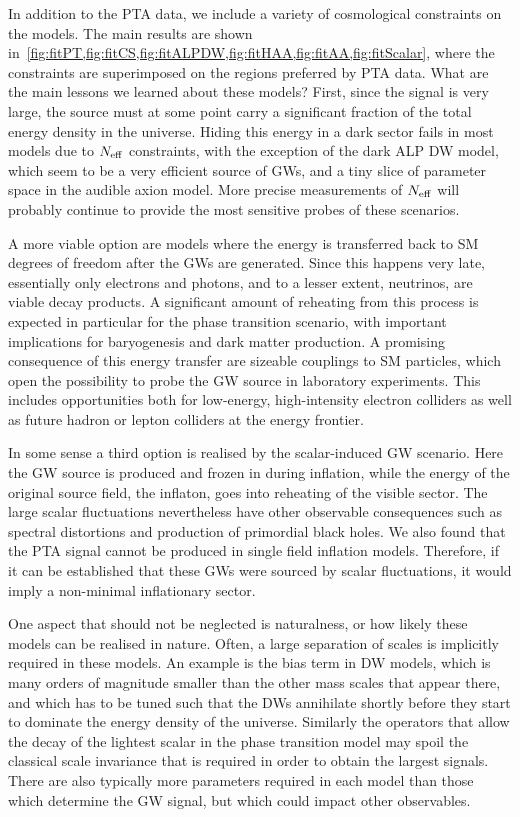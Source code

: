 \documentclass{article}
\begin{document}
In addition to the PTA data, we include a variety of cosmological constraints on the models. The main results are shown in~\cref{fig:fitPT,fig:fitCS,fig:fitALPDW,fig:fitHAA,fig:fitAA,fig:fitScalar}, where the constraints are superimposed on the regions preferred by PTA data. What are the main lessons we learned about these models? First, since the signal is very large, the source must at some point carry a significant fraction of the total energy density in the universe. Hiding this energy in a dark sector fails in most models due to $N_{\rm eff}$ constraints, with the exception of the dark ALP DW model, which seem to be a very efficient source of GWs, and a tiny slice of parameter space in the audible axion model. More precise measurements of $N_{\rm eff}$ will probably continue to provide the most sensitive probes of these scenarios. 

A more viable option are models where the energy is transferred back to SM degrees of freedom after the GWs are generated. Since this happens very late, essentially only electrons and photons, and to a lesser extent, neutrinos, are viable decay products. A significant amount of reheating from this process is expected in particular for the phase transition scenario, with important implications for baryogenesis and dark matter production. A promising consequence of this energy transfer are sizeable couplings to SM particles, which open the possibility to probe the GW source in laboratory experiments. This includes opportunities both for low-energy, high-intensity electron colliders as well as future hadron or lepton colliders at the energy frontier. 

In some sense a third option is realised by the scalar-induced GW scenario. Here the GW source is produced and frozen in during inflation, while the energy of the original source field, the inflaton, goes into reheating of the visible sector. The large scalar fluctuations nevertheless have other observable consequences such as spectral distortions and production of primordial black holes. We also found that the PTA signal cannot be produced in single field inflation models. Therefore, if it can be established that these GWs were sourced by scalar fluctuations, it would imply a non-minimal inflationary sector. 

One aspect that should not be neglected is naturalness, or how likely these models can be realised in nature. Often, a large separation of scales is implicitly required in these models. An example is the bias term in DW models, which is many orders of magnitude smaller than the other mass scales that appear there, and which has to be tuned such that the DWs annihilate shortly before they start to dominate the energy density of the universe. Similarly the operators that allow the decay of the lightest scalar in the phase transition model may spoil the classical scale invariance that is required in order to obtain the largest signals. There are also typically more parameters required in each model than those which determine the GW signal, but which could impact other observables.  
\end{document}

